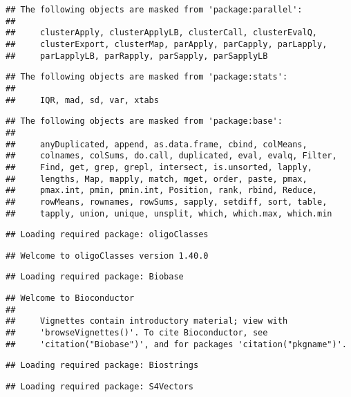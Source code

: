 \documentclass[]{article}
\begin{document}
\begin{verbatim}
## The following objects are masked from 'package:parallel':
## 
##     clusterApply, clusterApplyLB, clusterCall, clusterEvalQ,
##     clusterExport, clusterMap, parApply, parCapply, parLapply,
##     parLapplyLB, parRapply, parSapply, parSapplyLB
\end{verbatim}

\begin{verbatim}
## The following objects are masked from 'package:stats':
## 
##     IQR, mad, sd, var, xtabs
\end{verbatim}

\begin{verbatim}
## The following objects are masked from 'package:base':
## 
##     anyDuplicated, append, as.data.frame, cbind, colMeans,
##     colnames, colSums, do.call, duplicated, eval, evalq, Filter,
##     Find, get, grep, grepl, intersect, is.unsorted, lapply,
##     lengths, Map, mapply, match, mget, order, paste, pmax,
##     pmax.int, pmin, pmin.int, Position, rank, rbind, Reduce,
##     rowMeans, rownames, rowSums, sapply, setdiff, sort, table,
##     tapply, union, unique, unsplit, which, which.max, which.min
\end{verbatim}

\begin{verbatim}
## Loading required package: oligoClasses
\end{verbatim}

\begin{verbatim}
## Welcome to oligoClasses version 1.40.0
\end{verbatim}

\begin{verbatim}
## Loading required package: Biobase
\end{verbatim}

\begin{verbatim}
## Welcome to Bioconductor
## 
##     Vignettes contain introductory material; view with
##     'browseVignettes()'. To cite Bioconductor, see
##     'citation("Biobase")', and for packages 'citation("pkgname")'.
\end{verbatim}

\begin{verbatim}
## Loading required package: Biostrings
\end{verbatim}

\begin{verbatim}
## Loading required package: S4Vectors
\end{verbatim}
\end{document}
